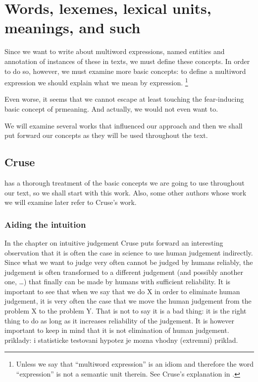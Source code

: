 
\chapter{Words, lexemes, lexical units, meanings, and such}
Since we want to write about multiword expressions, named entities and annotation of instances of these in texts, we must define these concepts. In order to do so, however, we must examine more basic concepts: to define a multiword expression we should explain what we mean by expression. %
\footnote{Unless we say that ``multiword expression'' is an idiom and therefore the word ``expression'' is not a semantic unit therein. See Cruse's explanation in .
} %

Even worse, it seems  that we cannot escape at least touching the fear-inducing basic concept of pr{meaning}. And actually, we would not even want to. 

We will examine several works that influenced our approach and then we shall put forward our concepts as they will be used throughout the text.

\section{Cruse}
\label{rel:cruse}
\citetext{D. A. Cruse in his book \emph{Lexical Semantics}, \citeyear{cruse:1986}} has a thorough treatment of the basic concepts we are going to use throughout our text, so we shall start with this work. Also, some other authors whose work we will examine later refer to Cruse's work. 

\subsection{Aiding the intuition}
In the chapter on intuitive judgement Cruse puts forward an interesting observation that it is often the case in science to use human judgement indirectly. Since what we want to judge very often cannot be judged by humans reliably, the judgement is often transformed to a different judgement (and possibly another one, \ldots) that finally can be made by humans with sufficient reliability. It is important to see that when we say that we do X in order to eliminate human judgement, it is very often the case that we move the human judgement from the problem X to the problem Y. That is not to say it is a bad thing: it is the right thing to do as long as it increases reliability of the judgement. It is however important to keep in mind that it is not elimination of human judgement. {\xxx priklady: i statisticke testovani hypotez je mozna vhodny (extremni) priklad.}

